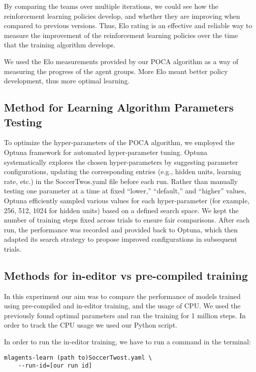 \documentclass{LSkill}
\begin{document}
By comparing the teams over multiple iterations, we could see how the reinforcement learning policies develop, and whether they are improving when compared to previous versions. Thus, Elo rating is an effective and reliable way to measure the improvement of the reinforcement learning policies over the time that the training algorithm develops. 

We used the Elo measurements provided by our POCA algorithm as a way of measuring the progress of the agent groups. More Elo meant better policy development, thus more optimal learning.

\subsection{Method for Learning Algorithm Parameters Testing}

To optimize the hyper-parameters of the POCA algorithm, we employed the Optuna framework for automated hyper-parameter tuning. Optuna systematically explores the chosen hyper-parameters by suggesting parameter configurations, updating the corresponding entries (e.g., hidden units, learning rate, etc.) in the SoccerTwos.yaml file before each run. Rather than manually testing one parameter at a time at fixed “lower,” “default,” and “higher” values, Optuna efficiently sampled various values for each hyper-parameter (for example, 256, 512, 1024 for hidden units) based on a defined search space. We kept the number of training steps fixed across trials to ensure fair comparisons. After each run, the performance was recorded and provided back to Optuna, which then adapted its search strategy to propose improved configurations in subsequent trials.

\subsection{Methods for in-editor vs pre-compiled training}
In this experiment our aim was to compare the performance of models trained using pre-compiled and in-editor training, and the usage of CPU. We used the previously found optimal parameters and ran the training for 1 million steps. In order to track the CPU usage we used our Python script.

In order to run the in-editor training, we have to run a command in the terminal: 
\begin{verbatim}
mlagents-learn (path to)SoccerTwost.yaml \ 
    --run-id=[our run id]
\end{verbatim}
\end{document}
